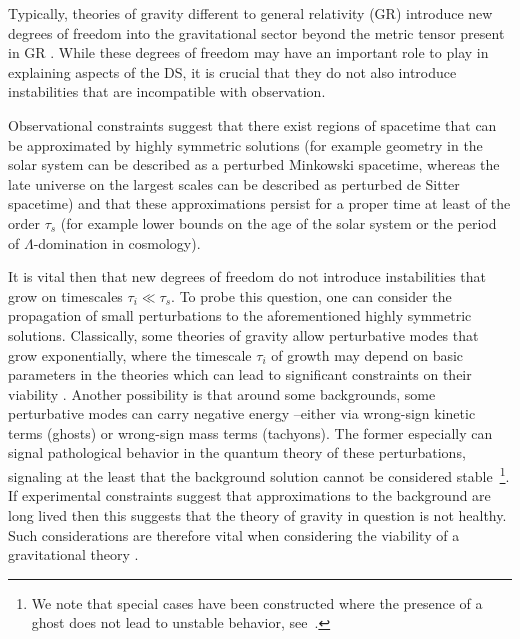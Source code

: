 \documentclass[twocolumn,prd,preprintnumbers,amsmath,amssymb,nofootinbib,superscriptaddress]{revtex4-1}
\begin{document}
Typically, theories of gravity different to general relativity (GR) introduce new degrees of freedom into the gravitational sector beyond the metric tensor present in GR \cite{Jain:2010ka,Clifton:2011jh}. While these degrees of freedom may have an important role to play in explaining aspects of the DS, it is crucial that they do not also introduce instabilities that are incompatible with observation. 

Observational constraints suggest that there exist regions of spacetime that can be approximated by highly symmetric solutions (for example geometry in the solar system can be described as a perturbed Minkowski spacetime, whereas the late universe on the largest scales can be described as perturbed de Sitter spacetime) and that these approximations persist for a proper time at least of the order $\tau_{s}$ (for example lower bounds on the age of the solar system or the period of $\Lambda$-domination in cosmology). 

It is vital then that new degrees of freedom do not introduce instabilities that grow on timescales $\tau_{i} \ll \tau_{s}$. To probe this question, one can consider 
the propagation of small perturbations to the aforementioned highly symmetric solutions. Classically, some theories of gravity allow perturbative modes that grow exponentially, 
where the timescale $\tau_{i}$ of growth may depend on basic parameters in the theories which can lead to significant constraints on their viability \cite{Seifert:2006kv,Seifert:2007fr}. 
Another possibility is that around some backgrounds, some perturbative modes can carry negative energy --either via wrong-sign kinetic terms (ghosts) 
or wrong-sign mass terms (tachyons). 
The former especially can signal pathological behavior in the quantum theory of these perturbations, signaling at the least that the background solution cannot be considered stable~\footnote{
We note that special cases have been constructed where the presence of a ghost does not lead to unstable behavior, see~\cite{Deffayet:2021nnt}.}.
If experimental constraints suggest that approximations to the background are long lived then this suggests that the theory of gravity 
in question is not healthy. Such considerations are therefore vital when considering the viability of a gravitational theory \cite{Boulware:1973my,Luty:2003vm,Cline:2003gs,Gorbunov:2005zk,DeFelice:2006pg,Rubakov:2008nh,Blas:2010hb,BeltranJimenez:2013btb,Chaichian:2014dfa,Langlois:2015cwa,BeltranJimenez:2019acz}.
\end{document}
